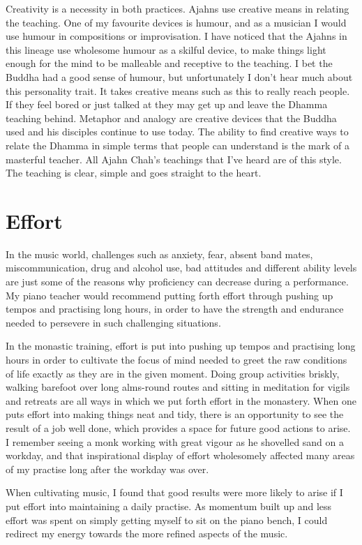 Creativity is a necessity in both practices. Ajahns use creative means
in relating the teaching. One of my favourite devices is humour, and as
a musician I would use humour in compositions or improvisation. I have
noticed that the Ajahns in this lineage use wholesome humour as a
skilful device, to make things light enough for the mind to be malleable
and receptive to the teaching. I bet the Buddha had a good sense of
humour, but unfortunately I don't hear much about this personality
trait. It takes creative means such as this to really reach people. If
they feel bored or just talked at they may get up and leave the Dhamma
teaching behind. Metaphor and analogy are creative devices that the
Buddha used and his disciples continue to use today. The ability to find
creative ways to relate the Dhamma in simple terms that people can
understand is the mark of a masterful teacher. All Ajahn Chah's
teachings that I've heard are of this style. The teaching is clear, 
simple and goes straight to the heart. 

\section{Effort}

In the music world, challenges such as anxiety, fear, absent band mates, 
miscommunication, drug and alcohol use, bad attitudes and different
ability levels are just some of the reasons why proficiency can decrease
during a performance. My piano teacher would recommend putting forth
effort through pushing up tempos and practising long hours, in order to
have the strength and endurance needed to persevere in such challenging
situations. 

In the monastic training, effort is put into pushing up tempos and
practising long hours in order to cultivate the focus of mind needed to
greet the raw conditions of life exactly as they are in the given
moment. Doing group activities briskly, walking barefoot over long
alms-round routes and sitting in meditation for vigils and retreats are
all ways in which we put forth effort in the monastery. When one puts
effort into making things neat and tidy, there is an opportunity to see
the result of a job well done, which provides a space for future good
actions to arise. I remember seeing a monk working with great vigour as
he shovelled sand on a workday, and that inspirational display of effort
wholesomely affected many areas of my practise long after the workday
was over. 

When cultivating music, I found that good results were more likely to
arise if I put effort into maintaining a daily practise. As momentum
built up and less effort was spent on simply getting myself to sit on
the piano bench, I could redirect my energy towards the more refined
aspects of the music.

